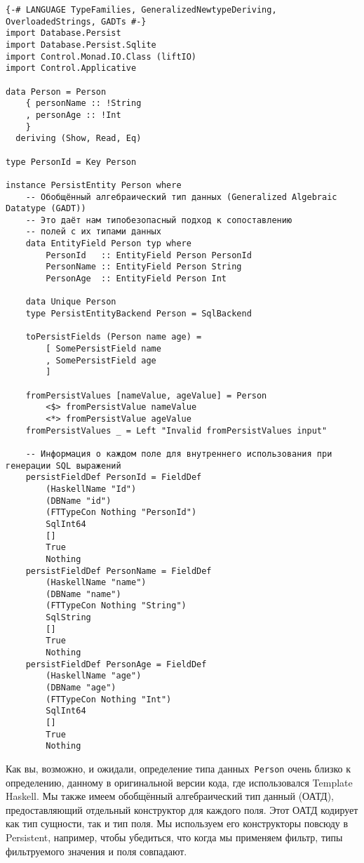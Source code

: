 \begin{lstlisting}
{-# LANGUAGE TypeFamilies, GeneralizedNewtypeDeriving, OverloadedStrings, GADTs #-}
import Database.Persist
import Database.Persist.Sqlite
import Control.Monad.IO.Class (liftIO)
import Control.Applicative

data Person = Person
    { personName :: !String
    , personAge :: !Int
    }
  deriving (Show, Read, Eq)

type PersonId = Key Person

instance PersistEntity Person where
    -- Обобщённый алгебраический тип данных (Generalized Algebraic Datatype (GADT))
    -- Это даёт нам типобезопасный подход к сопоставлению
    -- полей с их типами данных
    data EntityField Person typ where
        PersonId   :: EntityField Person PersonId
        PersonName :: EntityField Person String
        PersonAge  :: EntityField Person Int

    data Unique Person
    type PersistEntityBackend Person = SqlBackend

    toPersistFields (Person name age) =
        [ SomePersistField name
        , SomePersistField age
        ]

    fromPersistValues [nameValue, ageValue] = Person
        <$> fromPersistValue nameValue
        <*> fromPersistValue ageValue
    fromPersistValues _ = Left "Invalid fromPersistValues input"

    -- Информация о каждом поле для внутреннего использования при генерации SQL выражений
    persistFieldDef PersonId = FieldDef
        (HaskellName "Id")
        (DBName "id")
        (FTTypeCon Nothing "PersonId")
        SqlInt64
        []
        True
        Nothing
    persistFieldDef PersonName = FieldDef
        (HaskellName "name")
        (DBName "name")
        (FTTypeCon Nothing "String")
        SqlString
        []
        True
        Nothing
    persistFieldDef PersonAge = FieldDef
        (HaskellName "age")
        (DBName "age")
        (FTTypeCon Nothing "Int")
        SqlInt64
        []
        True
        Nothing
\end{lstlisting}

Как вы, возможно, и ожидали, определение типа данных~\lstinline'Person' очень
близко к определению, данному в оригинальной версии кода, где использовался
Template Haskell. Мы также имеем обобщённый алгебраический тип данный (ОАТД),
предоставляющий отдельный конструктор для каждого поля. Этот ОАТД кодирует как
тип сущности, так и тип поля. Мы используем его конструкторы повсюду в
Persistent, например, чтобы убедиться, что когда мы применяем фильтр, типы
фильтруемого значения и поля совпадают.

